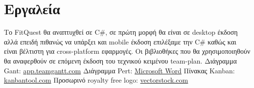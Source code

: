 \documentclass{article}
\begin{document}
\section{Εργαλεία}
Το FitQuest θα αναπτυχθεί σε C#, σε πρώτη μορφή θα είναι σε desktop έκδοση αλλά επειδή πιθανώς να υπάρξει και mobile έκδοση επιλέξαμε την C# καθώς και είναι βέλτιστη για cross-platform εφαρμογές. Οι βιβλιοθήκες που θα χρησιμοποιηθούν θα αναφερθούν σε επόμενη έκδοση του τεχνικού κειμένου team-plan.\newline
Διάγραμμα Gant: \href{https://app.teamgantt.com}{app.teamgantt.com}\newline
Διάγραμμα Pert: \href{https://www.microsoft.com/el-gr/microsoft-365/word}{Microsoft Word}\newline
Πίνακας Kanban: \href{www.kanbantool.com}{kanbantool.com}\newline
Προσωρινό royalty free logo: \href{https://www.Vectorstock.com/royalty-free-vector/rpg-creative-icon-from-gaming-icons-collection-vector-45969591}{vectorstock.com}
\end{document}
